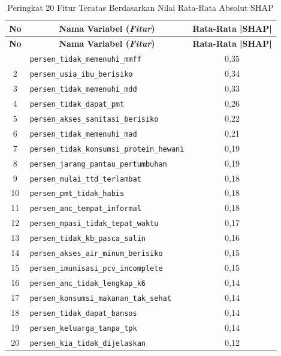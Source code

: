 \begin{longtable}{|c|p{}|c|}
    \caption{Peringkat 20 Fitur Teratas Berdasarkan Nilai Rata-Rata Absolut SHAP}
    \label{table:4.nilai_shap}\\
    \hline
    \textbf{No} & \multicolumn{1}{c|}{\textbf{Nama Variabel (\textit{Fitur})}} & \textbf{Rata-Rata |SHAP|} \tabularnewline 
    \hline
    \endfirsthead
    \hline
    \textbf{No} & \multicolumn{1}{c|}{\textbf{Nama Variabel (\textit{Fitur})}} & \textbf{Rata-Rata |SHAP|} \tabularnewline 
    \hline
    \endhead
    \hline
    \endfoot
    \hline
    \endlastfoot
    1 & \texttt{persen\_\allowbreak tidak\_\allowbreak memenuhi\_\allowbreak mmff} & 0,35 \tabularnewline 
    \hline
    2 & \texttt{persen\_\allowbreak usia\_\allowbreak ibu\_\allowbreak berisiko} & 0,34 \tabularnewline
    \hline
    3 & \texttt{persen\_\allowbreak tidak\_\allowbreak memenuhi\_\allowbreak mdd} & 0,33 \tabularnewline
    \hline
    4 & \texttt{persen\_\allowbreak tidak\_\allowbreak dapat\_\allowbreak pmt} & 0,26 \tabularnewline
    \hline
    5 & \texttt{persen\_\allowbreak akses\_\allowbreak sanitasi\_\allowbreak berisiko} & 0,22 \tabularnewline
    \hline
    6 & \texttt{persen\_\allowbreak tidak\_\allowbreak memenuhi\_\allowbreak mad} & 0,21 \tabularnewline
    \hline
    7 & \texttt{persen\_\allowbreak tidak\_\allowbreak konsumsi\_\allowbreak protein\_\allowbreak hewani} & 0,19 \tabularnewline
    \hline
    8 & \texttt{persen\_\allowbreak jarang\_\allowbreak pantau\_\allowbreak pertumbuhan} & 0,19 \tabularnewline
    \hline
    9 & \texttt{persen\_\allowbreak mulai\_\allowbreak ttd\_\allowbreak terlambat} & 0,18 \tabularnewline
    \hline
    10 & \texttt{persen\_\allowbreak pmt\_\allowbreak tidak\_\allowbreak habis} & 0,18 \tabularnewline
    \hline
    11 & \texttt{persen\_\allowbreak anc\_\allowbreak tempat\_\allowbreak informal} & 0,18 \tabularnewline
    \hline
    12 & \texttt{persen\_\allowbreak mpasi\_\allowbreak tidak\_\allowbreak tepat\_\allowbreak waktu} & 0,17 \tabularnewline
    \hline
    13 & \texttt{persen\_\allowbreak tidak\_\allowbreak kb\_\allowbreak pasca\_\allowbreak salin} & 0,16 \tabularnewline
    \hline
    14 & \texttt{persen\_\allowbreak akses\_\allowbreak air\_\allowbreak minum\_\allowbreak berisiko} & 0,15 \tabularnewline
    \hline
    15 & \texttt{persen\_\allowbreak imunisasi\_\allowbreak pcv\_\allowbreak incomplete} & 0,15 \tabularnewline
    \hline
    16 & \texttt{persen\_\allowbreak anc\_\allowbreak tidak\_\allowbreak lengkap\_\allowbreak k6} & 0,14 \tabularnewline
    \hline
    17 & \texttt{persen\_\allowbreak konsumsi\_\allowbreak makanan\_\allowbreak tak\_\allowbreak sehat} & 0,14 \tabularnewline
    \hline
    18 & \texttt{persen\_\allowbreak tidak\_\allowbreak dapat\_\allowbreak bansos} & 0,14 \tabularnewline
    \hline
    19 & \texttt{persen\_\allowbreak keluarga\_\allowbreak tanpa\_\allowbreak tpk} & 0,14 \tabularnewline
    \hline
    20 & \texttt{persen\_\allowbreak kia\_\allowbreak tidak\_\allowbreak dijelaskan} & 0,12 \tabularnewline
    \hline
\end{longtable}

